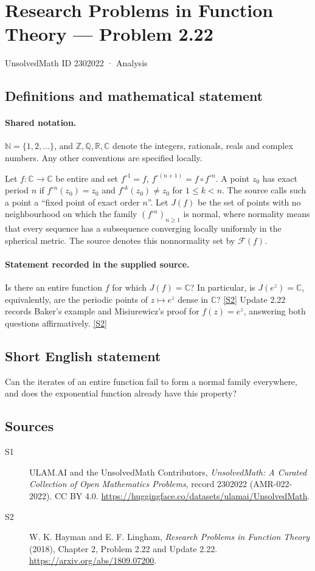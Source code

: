 \documentclass[11pt]{article}
\newcommand{\sref}[2]{\hyperlink{source:#1:#2}{[S#2]}}
\begin{document}
\setcounter{section}{2302021}
\section{Research Problems in Function Theory — Problem 2.22}\label{2302022}
{\small\sffamily UnsolvedMath ID 2302022 · Analysis}
\subsection{Definitions and mathematical statement}

\paragraph{Shared notation.}$\mathbb N=\{1,2,\ldots\}$, and $\mathbb Z,\mathbb Q,\mathbb R,\mathbb C$ denote the integers, rationals, reals and complex numbers. Any other conventions are specified locally.


Let $f:\mathbb C\to\mathbb C$ be entire and set $f^{\circ1}=f$, $f^{\circ(n+1)}=f\circ f^{\circ n}$.
A point $z_0$ has exact period $n$ if $f^{\circ n}(z_0)=z_0$ and $f^{\circ k}(z_0)\ne z_0$ for $1\le k<n$.
The source calls such a point a ``fixed point of exact order $n$''.
Let $J(f)$ be the set of points with no neighbourhood on which the family $(f^{\circ n})_{n\ge1}$ is normal, where normality means that every sequence has a subsequence converging locally uniformly in the spherical metric. The source denotes this nonnormality set by $\mathcal F(f)$.

\paragraph{Statement recorded in the supplied source.}
Is there an entire function $f$ for which $J(f)=\mathbb C$? In particular, is $J(e^z)=\mathbb C$, equivalently, are the periodic points of $z\mapsto e^z$ dense in $\mathbb C$? \sref{2302022}{2}
Update 2.22 records Baker's example and Misiurewicz's proof for $f(z)=e^z$, answering both questions affirmatively. \sref{2302022}{2}
\subsection{Short English statement}
Can the iterates of an entire function fail to form a normal family everywhere, and does the exponential function already have this property?
\subsection{Sources}
\begin{description}
\item[\hypertarget{source:2302022:1}{S1}] ULAM.AI and the UnsolvedMath Contributors, \emph{UnsolvedMath: A Curated Collection of Open Mathematics Problems}, record 2302022 (AMR-022-2022). CC BY 4.0. \url{https://huggingface.co/datasets/ulamai/UnsolvedMath}.
\item[\hypertarget{source:2302022:2}{S2}] W. K. Hayman and E. F. Lingham, \emph{Research Problems in Function Theory} (2018), Chapter 2, Problem 2.22 and Update 2.22. \url{https://arxiv.org/abs/1809.07200}.
\end{description}
\label{end:2302022}
\end{document}

